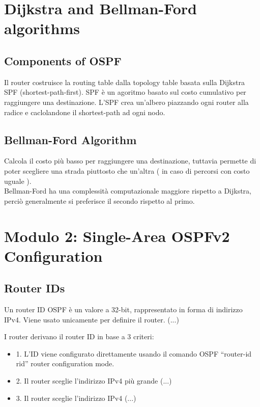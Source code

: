 \documentclass[12pt, a4paper]{article}
\begin{document}
	
	
	\section*{Dijkstra and Bellman-Ford algorithms}

	\subsection*{Components of OSPF}
	
	Il router costruisce la routing table dalla topology table basata sulla Dijkstra SPF (shortest-path-first). SPF è un agoritmo basato sul costo cumulativo per raggiungere una destinazione. L'SPF crea un'albero piazzando ogni router alla radice e caclolandone il shortest-path ad ogni nodo. 
	
	\subsection*{Bellman-Ford Algorithm}
	
	Calcola il costo più basso per raggiungere una destinazione, tuttavia permette di poter scegliere una strada piuttosto che un'altra ( in caso di percorsi con costo uguale ). \\ Bellman-Ford ha una complessità computazionale maggiore rispetto a Dijkstra, perciò generalmente si preferisce il secondo rispetto al primo.
	
	
	
	\section*{Modulo 2: Single-Area OSPFv2 Configuration}
	
	\subsection*{Router IDs}
	
	Un router ID OSPF è un valore a 32-bit, rappresentato in forma di indirizzo IPv4. Viene usato unicamente per definire il router. (...)
	
	I router derivano il router ID in base a 3 criteri:
	\begin{itemize}
		\item 1. L'ID viene configurato direttamente usando il comando OSPF ``router-id rid'' router configuration mode.
		\item 2. Il router sceglie l'indirizzo IPv4 più grande (...)
		\item 3. Il router sceglie l'indirizzo IPv4 (...)
	\end{itemize}
	
\end{document}
